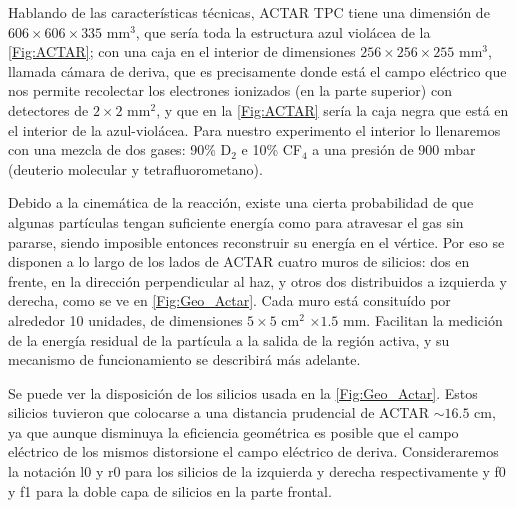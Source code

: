 Hablando de las características técnicas, ACTAR TPC tiene una dimensión de $606 \times 606 \times 335 $ mm$^3$, que sería toda la estructura azul violácea de la \cref{Fig:ACTAR}; con una caja en el interior de dimensiones $256 \times 256 \times 255 $ mm$^3$, llamada cámara de deriva, que es precisamente donde está el campo eléctrico que nos permite recolectar los electrones ionizados (en la parte superior) con detectores de $2 \times 2$ mm$^2$, y que en la \cref{Fig:ACTAR} sería la caja negra que está en el interior de la azul-violácea. Para nuestro experimento el interior lo llenaremos con una mezcla de dos gases: 90\% D$_2$ e 10\% CF$_4$ a una presión de 900 mbar (deuterio molecular y tetrafluorometano).

Debido a la cinemática de la reacción, existe una cierta probabilidad de que algunas partículas tengan suficiente energía como para atravesar el gas sin pararse, siendo imposible entonces reconstruir su energía en el vértice. Por eso se disponen a lo largo de los lados de ACTAR cuatro muros de silicios: dos en frente, en la dirección perpendicular al haz, y otros dos distribuidos a izquierda y derecha, como se ve en  \cref{Fig:Geo_Actar}. Cada muro está consituído por alrededor 10 unidades, de dimensiones $5 \times 5$ cm$^2$ $\times 1.5$ mm. Facilitan la medición de la energía residual de la partícula a la salida de la región activa, y su mecanismo de funcionamiento se describirá más adelante.

Se puede ver la disposición de los silicios usada en la \cref{Fig:Geo_Actar}. Estos silicios tuvieron que colocarse a una distancia prudencial de ACTAR $\sim 16.5$ cm, ya que aunque disminuya la eficiencia geométrica es posible que el campo eléctrico de los mismos distorsione el campo eléctrico de deriva. Consideraremos la notación l0 y r0 para los silicios de la izquierda y derecha respectivamente y f0  y f1 para la doble capa de silicios en la parte frontal.

